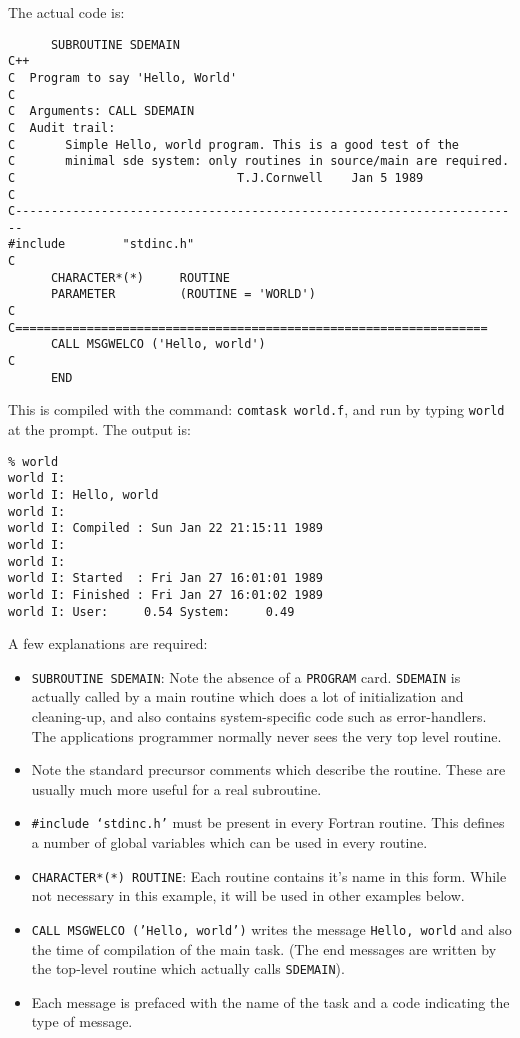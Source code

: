 The actual code is:
\begin{verbatim}
      SUBROUTINE SDEMAIN
C++
C  Program to say 'Hello, World'
C
C  Arguments: CALL SDEMAIN
C  Audit trail:
C       Simple Hello, world program. This is a good test of the
C       minimal sde system: only routines in source/main are required.
C                               T.J.Cornwell    Jan 5 1989
C 
C-----------------------------------------------------------------------
#include        "stdinc.h"
C
      CHARACTER*(*)     ROUTINE
      PARAMETER         (ROUTINE = 'WORLD')
C
C==================================================================
      CALL MSGWELCO ('Hello, world')
C
      END
\end{verbatim}
This is compiled with the command: {\tt comtask world.f}, and run by typing
{\tt world} at the prompt. The output is:
\begin{verbatim}
% world
world I:
world I: Hello, world
world I:
world I: Compiled : Sun Jan 22 21:15:11 1989
world I:
world I:
world I: Started  : Fri Jan 27 16:01:01 1989
world I: Finished : Fri Jan 27 16:01:02 1989
world I: User:     0.54 System:     0.49
\end{verbatim}

A few explanations are required:
\begin{itemize}
\item {\tt SUBROUTINE SDEMAIN}: Note the absence of a {\tt PROGRAM} card.
{\tt SDEMAIN} is actually called by a main routine which does a lot of
initialization and cleaning-up, and also contains system-specific code
such as error-handlers.  The applications programmer normally never
sees the very top level routine.
\item Note the standard precursor comments which describe the routine. These
are usually much more useful for a real subroutine.
\item {\tt \#include `stdinc.h'} must be present in every
Fortran routine. This defines a number of global variables which can be
used in every routine.
\item {\tt CHARACTER*(*) ROUTINE}: Each routine contains it's name
in this form. While not necessary in this example, it will be used in other
examples below.
\item {\tt CALL MSGWELCO ('Hello, world')} writes the message {\tt Hello, 
world} and also the
time of compilation of the main task. (The end messages are written
by the top-level routine which actually calls {\tt SDEMAIN}).
\item Each message is prefaced with the name of the task and a code
indicating the type of message. 
\end{itemize}

